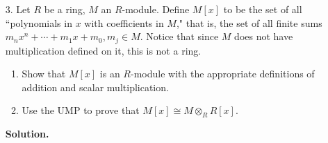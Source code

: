 \documentclass[9pt]{article}
\begin{document}
\begin{enumerate}
   \item[3.]   Let $R$ be a ring, $M$ an $R$-module. Define $M[x]$ to be the set
               of all ``polynomials in $x$ with coefficients in $M$," that is,
               the set of all finite sums
               $m_nx^n + \cdots + m_1x + m_0, m_j \in M$. Notice that since $M$
               does not have multiplication defined on it, this is not a ring.
               \begin{enumerate}
                  \item Show that $M[x]$ is an $R$-module with the appropriate
                        definitions of addition and scalar multiplication.
                  \item Use the UMP to prove that $M[x] \cong M \otimes_R R[x]$.
               \end{enumerate}

      \textbf{Solution.}
      

\end{enumerate}
\end{document}
